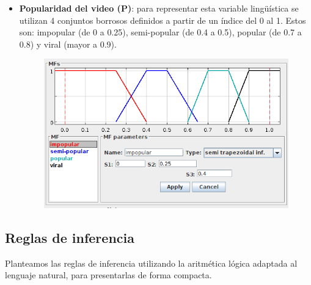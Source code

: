 \documentclass{article}
\begin{document}
\begin{itemize}
\begin{figure}[H]
	\end{figure}
	\item \textbf{Popularidad del video (P)}: para representar esta variable lingüística se utilizan 4 conjuntos borrosos definidos a partir de un índice del 0 al 1. Estos son: impopular (de 0 a 0.25), semi-popular (de 0.4 a 0.5), popular (de 0.7 a 0.8) y viral (mayor a 0.9).
	\begin{figure}[H]
		\centering
		\includegraphics[scale=0.55]{./Images/popularidad.png}
	\end{figure}
\end{itemize}

\subsection{Reglas de inferencia}

Planteamos las reglas de inferencia utilizando la aritmética lógica adaptada al lenguaje natural, para presentarlas de forma compacta. 
\end{document}
